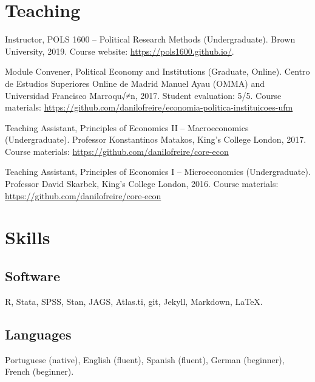 \documentclass[a4paper]{article}
\renewenvironment{itemize}{
  \begin{list}{}{
    \setlength{\leftmargin}{1.5em}
  }
}{
  \end{list}
}
\begin{document}
\section*{Teaching}

\begin{itemize}
    \item Instructor, POLS 1600 -- Political Research Methods (Undergraduate). Brown University, 2019. Course website: \href{https://pols1600.github.io}{https://pols1600.github.io/}.
	\item Module Convener, Political Economy and Institutions (Graduate, Online). Centro de Estudios Superiores Online de Madrid Manuel Ayau (OMMA) and Universidad Francisco Marroqu√≠n, 2017. Student evaluation: 5/5. Course materials: \href{https://github.com/danilofreire/economia-politica-instituicoes-ufm}{https://github.com/danilofreire/economia-politica-instituicoes-ufm}
	\item Teaching Assistant, Principles of Economics II -- Macroeconomics (Undergraduate). Professor Konstantinos Matakos, King's College London, 2017. Course materials: \href{https://github.com/danilofreire/core-econ}{https://github.com/danilofreire/core-econ}
	\item Teaching Assistant, Principles of Economics I -- Microeconomics (Undergraduate). Professor David Skarbek, King's College London, 2016. Course materials: \href{https://github.com/danilofreire/core-econ}{https://github.com/danilofreire/core-econ}
\end{itemize}

\section*{Skills}

\subsection*{Software}

\begin{itemize}
	\item R, Stata, SPSS, Stan, JAGS, Atlas.ti, git, Jekyll, Markdown, \LaTeX{}.
\end{itemize}

\subsection*{Languages}

\begin{itemize}
	\item Portuguese (native), English (fluent), Spanish (fluent), German (beginner), French (beginner).
\end{itemize}
\end{document}
